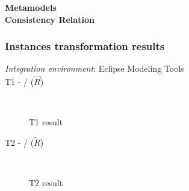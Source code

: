 \documentclass{article}
\begin{document}
\textbf{Metamodels}
~\\

\textbf{Consistency Relation}


\subsubsection{Instances transformation results}
\textit{Integration environment}: Eclipse Modeling Tools
~\\

T1 -  /  ($\overrightarrow{R}$)
\begin{figure}[ht]
    \centering
    \mbox{\quad\qquad
          }
    \caption{T1 result}
    \label{fig:T1}
\end{figure}

\pagebreak

T2 -  /  ($\overleftarrow{R}$)
\begin{figure}[ht]
    \centering
    \mbox{\quad\qquad\quad
          }
    \caption{T2 result}
    \label{fig:T2}
\end{figure}

~\\
\end{document}
